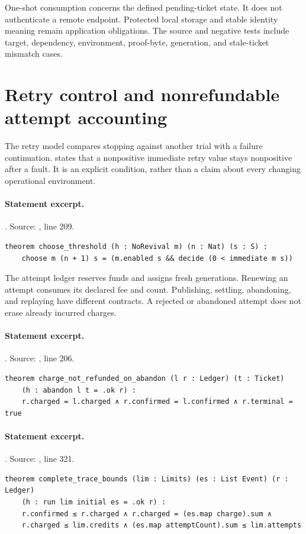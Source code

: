 \documentclass[11pt]{article}
\begin{document}
One-shot consumption concerns the defined pending-ticket state. It does not
authenticate a remote endpoint. Protected local storage and stable identity
meaning remain application obligations. The source and negative tests include
target, dependency, environment, proof-byte, generation, and stale-ticket
mismatch cases.

\section{Retry control and nonrefundable attempt accounting}
The retry model compares stopping against another trial with a failure
continuation.  states that a nonpositive immediate retry value
stays nonpositive after a fault. It is an explicit condition, rather than a
claim about every changing operational environment.

\paragraph{Statement excerpt.}. Source: , line 209.
\begin{lstlisting}[style=AVOCSource]
theorem choose_threshold (h : NoRevival m) (n : Nat) (s : S) :
    choose m (n + 1) s = (m.enabled s && decide (0 < immediate m s))
\end{lstlisting}


The attempt ledger reserves funds and assigns fresh generations. Renewing an
attempt consumes its declared fee and count. Publishing, settling, abandoning,
and replaying have different contracts. A rejected or abandoned attempt does
not erase already incurred charges.

\paragraph{Statement excerpt.}. Source: , line 206.
\begin{lstlisting}[style=AVOCSource]
theorem charge_not_refunded_on_abandon (l r : Ledger) (t : Ticket)
    (h : abandon l t = .ok r) :
    r.charged = l.charged ∧ r.confirmed = l.confirmed ∧ r.terminal = true
\end{lstlisting}

\paragraph{Statement excerpt.}. Source: , line 321.
\begin{lstlisting}[style=AVOCSource]
theorem complete_trace_bounds (lim : Limits) (es : List Event) (r : Ledger)
    (h : run lim initial es = .ok r) :
    r.confirmed ≤ r.charged ∧ r.charged = (es.map charge).sum ∧
    r.charged ≤ lim.credits ∧ (es.map attemptCount).sum ≤ lim.attempts
\end{lstlisting}
\end{document}
